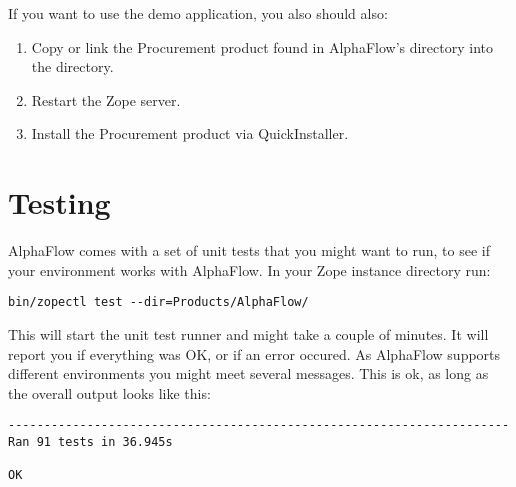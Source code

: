 If you want to use the demo application, you also should also:

\begin{enumerate}
  \item Copy or link the Procurement product found in AlphaFlow's
     directory into the 
    directory.
  \item Restart the Zope server.
  \item Install the Procurement product via QuickInstaller.
\end{enumerate}


\section{Testing}

AlphaFlow comes with a set of unit tests that you might want to run, to see if your 
environment works with AlphaFlow. In your Zope instance directory run:

\begin{verbatim}
bin/zopectl test --dir=Products/AlphaFlow/
\end{verbatim}

This will start the unit test runner and might take a couple of minutes. It will report you
if everything was OK, or if an error occured. As AlphaFlow supports different environments
you might meet several  messages. This is ok, as long as the overall output looks like this:

\begin{verbatim}
----------------------------------------------------------------------
Ran 91 tests in 36.945s

OK
\end{verbatim}
